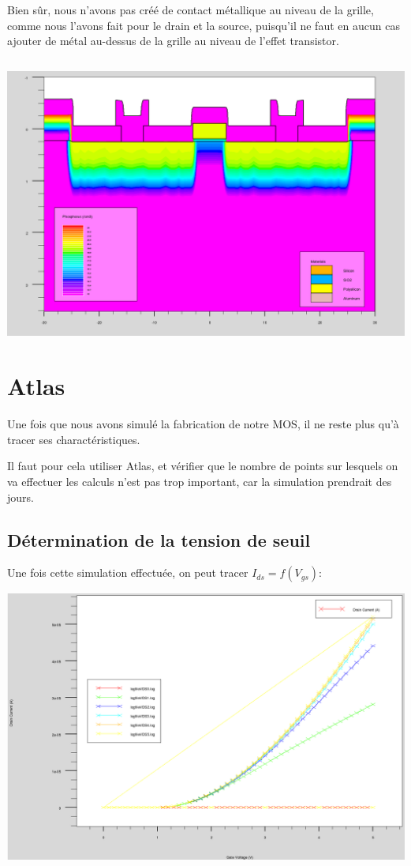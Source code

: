 \documentclass{article}
\begin{document}
Bien sûr, nous n’avons pas créé de contact métallique au niveau de la grille, comme nous l’avons fait pour le drain et la source, puisqu’il ne faut en aucun cas ajouter de métal au-dessus de la grille au niveau de l’effet transistor.

\inputminted[linenos,firstnumber=98,firstline=98]{sh}{final_named.in}

\includegraphics[width=\linewidth]{final.png}

\section{Atlas}

Une fois que nous avons simulé la fabrication de notre MOS, il ne reste plus qu’à tracer ses charactéristiques.

Il faut pour cela utiliser Atlas, et vérifier que le nombre de points sur lesquels on va effectuer les calculs n’est pas trop important, car la simulation prendrait des jours.

\subsection{Détermination de la tension de seuil}

Une fois cette simulation effectuée, on peut tracer $I_{ds}=f(V_{gs})$:

\includegraphics[width=\linewidth]{Id_f_de_VG_pour5_VD.png}
\end{document}
